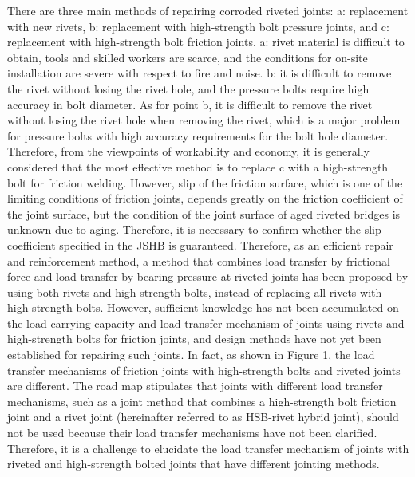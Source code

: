 There are three main methods of repairing corroded riveted joints: a: replacement with new rivets, b: replacement with high-strength bolt pressure joints, and c: replacement with high-strength bolt friction joints. a: rivet material is difficult to obtain, tools and skilled workers are scarce, and the conditions for on-site installation are severe with respect to fire and noise. b: it is difficult to remove the rivet without losing the rivet hole, and the pressure bolts require high accuracy in bolt diameter. As for point b, it is difficult to remove the rivet without losing the rivet hole when removing the rivet, which is a major problem for pressure bolts with high accuracy requirements for the bolt hole diameter. Therefore, from the viewpoints of workability and economy, it is generally considered that the most effective method is to replace c with a high-strength bolt for friction welding. However, slip of the friction surface, which is one of the limiting conditions of friction joints, depends greatly on the friction coefficient of the joint surface, but the condition of the joint surface of aged riveted bridges is unknown due to aging. Therefore, it is necessary to confirm whether the slip coefficient specified in the \ac{JSHB} \cite{douji2017} is guaranteed. Therefore, as an efficient repair and reinforcement method, a method that combines load transfer by frictional force and load transfer by bearing pressure at riveted joints has been proposed by using both rivets and high-strength bolts, instead of replacing all rivets with high-strength bolts. However, sufficient knowledge has not been accumulated on the load carrying capacity and load transfer mechanism of joints using rivets and high-strength bolts for friction joints, and design methods have not yet been established for repairing such joints. In fact, as shown in Figure 1, the load transfer mechanisms of friction joints with high-strength bolts and riveted joints are different. The road map stipulates that joints with different load transfer mechanisms, such as a joint method that combines a high-strength bolt friction joint and a rivet joint (hereinafter referred to as HSB-rivet hybrid joint), should not be used because their load transfer mechanisms have not been clarified. Therefore, it is a challenge to elucidate the load transfer mechanism of joints with riveted and high-strength bolted joints that have different jointing methods.

